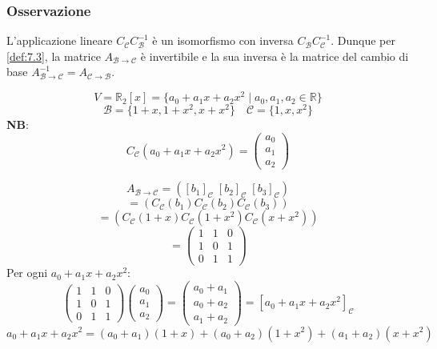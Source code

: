 \documentclass[a4paper]{article}
\theoremstyle{break}
\theoremstyle{break}
\theoremstyle{break}
\theoremstyle{break}
\begin{document}
\subsubsection{Osservazione}
L'applicazione lineare \( C_{\mathcal{C}} C_{\mathcal{B}}^{-1} \) è un isomorfismo con
inversa \( C_{\mathcal{B}} C_{\mathcal{C}}^{-1} \). Dunque per \ref{def:7.3}, la matrice
\( A_{\mathcal{B} \to \mathcal{C}} \) è invertibile e la sua inversa è la matrice del 
cambio di base \( A_{\mathcal{B} \to \mathcal{C}}^{-1} = A_{\mathcal{C} \to \mathcal{B}} \).

\begin{example}
  \[
    V = \mathbb{R}_2[x]=\{a_0 + a_1 x + a_2 x^2 \;|\; a_0,a_1,a_2 \in \mathbb{R}\} 
  \] 
  \[
  \mathcal{B} = \{1 + x, 1 + x^2, x + x^2\} \quad \mathcal{C} = \{1, x, x^2\} 
  \] 
  \textbf{NB}: \[ C_ \mathcal{C}(a_0 + a_1 x + a_2 x^2) = \begin{pmatrix} 
    a_0\\
    a_1\\
    a_2
  \end{pmatrix}  \]

  \[
    A_{\mathcal{B} \to \mathcal{C}} =  \left( [b_1]_ \mathcal{C} \; [b_2]_ \mathcal{C}\; [b_3]_ \mathcal{C} \right) 
  \] 
  \[
   = \left( C_ \mathcal{C}(b_1) C_ \mathcal{C}(b_2) C_ \mathcal{C}(b_3) \right)
  \] 
  \[
  = \left( C_ \mathcal{C}(1+x) C_ \mathcal{C}(1+x^2) C_ \mathcal{C}(x+x^2) \right)
  \] 
  \[
  = 
  \begin{pmatrix} 
    1 & 1 & 0\\
    1 & 0 & 1\\
    0 & 1 & 1
  \end{pmatrix} 
  \] 
  Per ogni \( a_0 + a_1 x + a_2 x^2 \):
  \[
  \begin{pmatrix} 
    1 & 1 & 0\\
    1 & 0 & 1\\
    0 & 1 & 1
  \end{pmatrix} 
  \begin{pmatrix} 
    a_0\\
    a_1\\
    a_2
  \end{pmatrix} 
  =
  \begin{pmatrix} 
    a_0 + a_1\\
    a_0 + a_2\\
    a_1 + a_2
  \end{pmatrix} 
  =
  [a_0 + a_1 x + a_2 x^2]_ \mathcal{C}
  \] 
  \vspace{1em}
  \[
  a_0 + a_1 x + a_2 x^2 = (a_0 + a_1)(1+x) + (a_0 + a_2)(1+x^2) + (a_1 + a_2)(x+x^2)
  \] 
\end{example}
\end{document}
